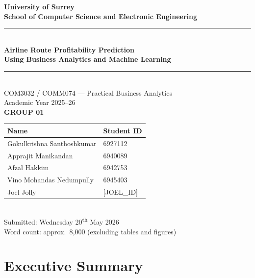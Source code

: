 \documentclass[12pt,a4paper]{article}
\begin{document}

\begin{titlepage}
  \centering
  \vspace*{1cm}
  {\Large\bfseries University of Surrey\\[4pt]
   School of Computer Science and Electronic Engineering}\\[1.5cm]

  \rule{\linewidth}{1.5pt}\\[0.4cm]
  {\LARGE\bfseries\color{surreyblue}
    Airline Route Profitability Prediction\\[8pt]
    Using Business Analytics and Machine Learning}\\[0.4cm]
  \rule{\linewidth}{1.5pt}\\[1.5cm]

  {\large COM3032 / COMM074 --- Practical Business Analytics\\[6pt]
   Academic Year 2025--26}\\[2cm]

  {\large\bfseries GROUP 01}\\[1cm]

  \begin{tabular}{ll}
    \toprule
    \textbf{Name} & \textbf{Student ID} \\
    \midrule
    Gokulkrishna Santhoshkumar  & 6927112 \\
    Apprajit Manikandan          & 6940089 \\
    Afzal Hakkim                 & 6942753 \\
    Vino Mohandas Nedumpully     & 6945403 \\
    Joel Jolly                   & [JOEL\_ID] \\  %
    \bottomrule
  \end{tabular}\\[2cm]

  {\large Submitted: Wednesday 20\textsuperscript{th} May 2026}\\[0.5cm]
  {\normalsize Word count: approx.\ 8,000 (excluding tables and figures)}
\end{titlepage}

\newpage
\section*{Executive Summary}
\end{document}
